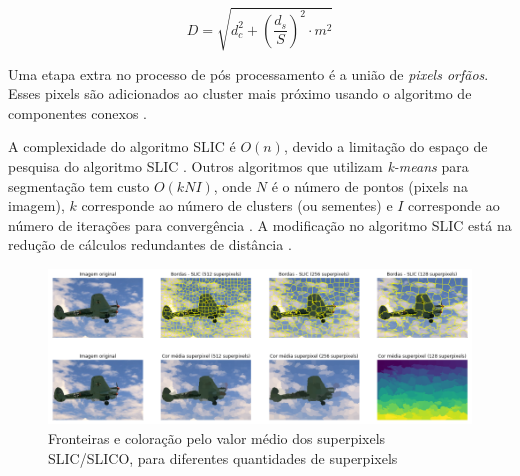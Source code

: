 \begin{document}
\begin{equation}
 D = \sqrt{d_c^2 + \left(\frac{d_s}{S} \right)^2 \cdot m^2}
 \label{equ:CIELAB3}
\end{equation}

Uma etapa extra no processo de pós processamento é a união de \textit{pixels orfãos}. Esses pixels são adicionados ao cluster mais próximo usando o algoritmo de componentes conexos \cite{SLIC}.

A complexidade do algoritmo SLIC é $O(n)$, devido a limitação do espaço de pesquisa do algoritmo SLIC \cite{SLIC1}. Outros algoritmos que utilizam \textit{k-means} para segmentação tem custo $O(kNI)$, onde $N$ é o número de pontos (pixels na imagem), $k$ corresponde ao número de clusters (ou sementes) e $I$ corresponde ao número de iterações para convergência \cite{SLIC1}. A modificação no algoritmo SLIC está na redução de cálculos redundantes de distância \cite{SLIC1}. 



\begin{figure}[ht]
\centering
\includegraphics[width=1.\textwidth]{slic_segmentation_compare.png}
\caption{Fronteiras e coloração pelo valor médio dos superpixels SLIC/SLICO, para diferentes quantidades de superpixels}
\label{fig:SLICO}
\end{figure}
\end{document}
